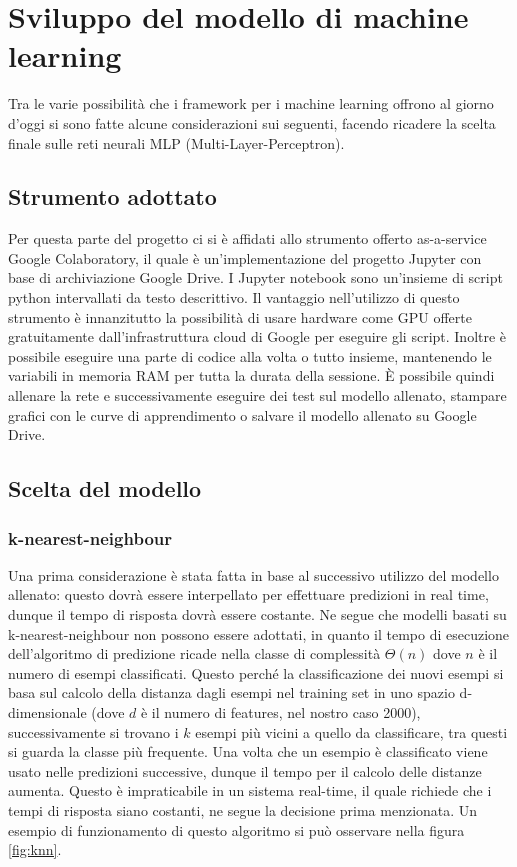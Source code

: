 \section{Sviluppo del modello di machine learning}
Tra le varie possibilità che i framework per i machine learning offrono al giorno d'oggi si sono fatte alcune considerazioni sui seguenti, facendo ricadere la scelta finale sulle reti neurali MLP (Multi-Layer-Perceptron).

\subsection{Strumento adottato}
Per questa parte del progetto ci si è affidati allo strumento offerto as-a-service Google Colaboratory, il quale è un'implementazione del progetto Jupyter con base di archiviazione Google Drive.
I Jupyter notebook sono un'insieme di script python intervallati da testo descrittivo.
Il vantaggio nell'utilizzo di questo strumento è innanzitutto la possibilità di usare hardware come GPU offerte gratuitamente dall'infrastruttura cloud di Google per eseguire gli script. Inoltre è possibile eseguire una parte di codice alla volta o tutto insieme, mantenendo le variabili in memoria RAM per tutta la durata della sessione. È possibile quindi allenare la rete e successivamente eseguire dei test sul modello allenato, stampare grafici con le curve di apprendimento o salvare il modello allenato su Google Drive.

\subsection{Scelta del modello}
\subsubsection{k-nearest-neighbour}
Una prima considerazione è stata fatta in base al successivo utilizzo del modello allenato: questo dovrà essere interpellato per effettuare predizioni in real time, dunque il tempo di risposta dovrà essere costante. Ne segue che modelli basati su k-nearest-neighbour non possono essere adottati, in quanto il tempo di esecuzione dell'algoritmo di predizione ricade nella classe di complessità $\Theta (n)$ dove $n$ è il numero di esempi classificati. Questo perché la classificazione dei nuovi esempi si basa sul calcolo della distanza dagli esempi nel training set in uno spazio d-dimensionale (dove $d$ è il numero di features, nel nostro caso 2000), successivamente si trovano i $k$ esempi più vicini a quello da classificare, tra questi si guarda la classe più frequente. Una volta che un esempio è classificato viene usato nelle predizioni successive, dunque il tempo per il calcolo delle distanze aumenta. Questo è impraticabile in un sistema real-time, il quale richiede che i tempi di risposta siano costanti, ne segue la decisione prima menzionata.
Un esempio di funzionamento di questo algoritmo si può osservare nella figura \ref{fig:knn}.


